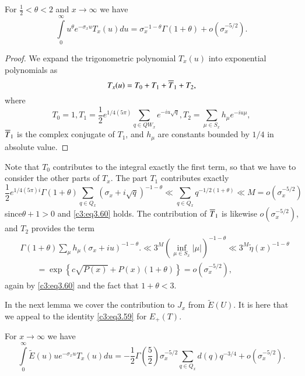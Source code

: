 \begin{lemma}\label{c3:lem3.7}
  For $\frac{1}{2} < \theta < 2$ and $x \to \infty$ we have 
  $$
  \int\limits_0^\infty u^\theta e^{- \sigma_x u} T_x (u) du =
  \sigma_x^{-1- \theta} \Gamma (1+ \theta) + o (\sigma_x^{-5/2}).
  $$
\end{lemma}

\begin{proof}
  We expand the trigonometric polynomial $T_x (u)$ into exponential
  polynomials as
  $$
  T_x (u) = T_0 + T_1 + \overline{T}_1 + T_2,
  $$
  where 
  $$
  T_0 =1, T_1= \frac{1}{2} e^{1/4 (5 \pi)} \sum_{q \in QW_x} e^{- iu
    \sqrt{q}}, T_2 = \sum_{\mu \in S_x} h_{\mu} e^{-i u \mu},
  $$
  $\overline{T}_1$ is the complex conjugate of $T_1$, and $h_\mu$ are
  constants bounded by $1/4$ in absolute value.
\end{proof}

Note that $T_0$ contributes to the integral exactly the first term, so
that we have to consider the other parts of $T_x$. The part $T_1$
contributes exactly
$$
\frac{1}{2} e^{1/4 (5 \pi)i} \Gamma (1+ \theta) \sum_{q \in Q_x}
(\sigma_x + i \sqrt{q})^{-1-\theta} \ll \sum_{q \in Q_x} q^{- 1/2
  (1+\theta)} \ll M= o \left(\sigma^{-5/2}_{x} \right) 
$$
since\pageoriginale $\theta + 1 > 0$ and \eqref{c3:eq3.60} holds. The contribution
of $\overline{T}_1$ is likewise $o(\sigma_x^{-5/2})$, and $T_2$ provides
the term
\begin{align*}
&  \Gamma (1+ \theta) \sum_{\mu} h_\mu (\sigma_x + iu)^{-1-\theta}. \ll
  3^M \left(\inf\limits_{\mu \in S_x} |\mu|\right)^{-1-\theta} \ll 3^M
  \tilde{\eta} (x)^{-1-\theta}\\  
&\qquad  = \exp \left\{ c\sqrt{P(x)} + P(x) (1+ \theta)\right\} =
  o\left(\sigma_x^{-5/2} \right),
\end{align*}
again by \eqref{c3:eq3.60} and the fact that $1+ \theta < 3$.

In the next lemma we cover the contribution to $J_x$ from
$\tilde{E}(U)$. It is here that we appeal to the identity
\eqref{c3:eq3.59} for $E_+ (T)$.

\begin{lemma}\label{c3:lem3.8}
  For $x \to \infty$ we have
  $$
  \int\limits_0^\infty \tilde{E} (u) u e^{-\sigma_x u} T_x (u) du=
  -\frac{1}{2} \Gamma \left(\frac{5}{2} \right) \sigma_x^{-5/2}
  \sum_{q \in Q_x} d(q) q^{-3/4} + o(\sigma^{-5/2}_x).
  $$
\end{lemma}

